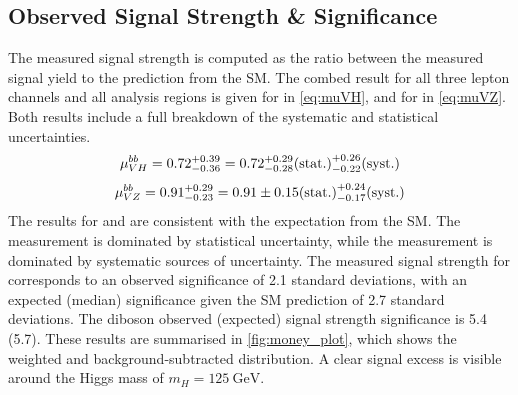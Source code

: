 



\subsection{Observed Signal Strength \& Significance}\label{sec:signal_strengh_sigs}

The measured signal strength is computed as the ratio between the measured signal yield to the prediction from the SM.
The combed result for all three lepton channels and all analysis regions is given for \muVH in \cref{eq:muVH}, and for \muVZ in \cref{eq:muVZ}.
Both results include a full breakdown of the systematic and   statistical uncertainties.
%
\begin{equation}\label{eq:muVH}
  \mu_{VH}^{bb} = 0.72 ^{+0.39}_{-0.36} = 0.72 ^{+0.29}_{-0.28}  \mathrm{(stat.)} ^{+0.26}_{-0.22} \mathrm{(syst.)}
\end{equation}
%
\begin{equation}\label{eq:muVZ}
  \mu_{VZ}^{bb} = 0.91 ^{+0.29}_{-0.23} = 0.91 \pm 0.15 \mathrm{(stat.)} ^{+0.24}_{-0.17} \mathrm{(syst.)} 
\end{equation}
%
The results for \muVH and \muVZ are consistent with the expectation from the SM.
The \muVH measurement is dominated by statistical uncertainty, while the \muVZ measurement is dominated by systematic sources of uncertainty.
The measured signal strength for \muVZ corresponds to an observed significance of 2.1 standard deviations, with an expected (median) significance given the SM prediction of 2.7 standard deviations.
The diboson observed (expected) signal strength significance is 5.4 (5.7).
These results are summarised in \cref{fig:money_plot}, which shows the weighted and background-subtracted \mJ distribution.
A clear signal excess is visible around the Higgs mass of $m_H = \SI{125}{\GeV}$.


